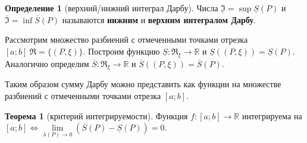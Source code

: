 \documentclass{report}
\theoremstyle{definition}
\newtheorem{definition}{Определение}[section]
\newtheorem{theorem}{Теорема}[section]
\begin{document}
\begin{definition}[верхний/нижний интеграл Дарбу]
  Числа $\underline{\mathfrak{I}}=\sup\underline{S}(P)$ и $\overline{\mathfrak{I}}=\inf\overline{S}(P)$ называются
  \textbf{нижним} и \textbf{верхним интегралом Дарбу}.
\end{definition}

Рассмотрим множество разбиений с отмеченными точками отрезка $[a;b] \ \Re = \{(P,\xi)\}$. Построим функцию $\underline{S}:
\Re_{\xi}\rightarrow\mathbb{R}$ и $\underline{S}((P,\xi)) = \underline{S}(P)$. Аналогично определим $\overline{S}:
\Re_{\xi}\rightarrow\mathbb{R}$ и $\overline{S}((P,\xi)) = \overline{S}(P)$.

Таким образом сумму Дарбу можно представить как функции на множестве разбиений с отмеченными точками отрезка $[a;b]$.

\begin{theorem}[критерий интегрируемости]
  Функция $f:[a;b]\rightarrow\mathbb{R}$ интегрируема на $[a;b] \iff \underset{\lambda (P)\rightarrow0}{\lim}
  (\overline{S}(P) - \underline{S}(P)) = 0$.  
\end{theorem}
\end{document}
